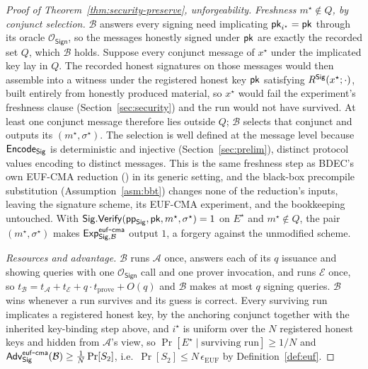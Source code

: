 \begin{proof}[Proof of Theorem~\ref{thm:security-preserve}, unforgeability]
\emph{Freshness $m^\star\notin Q$, by conjunct selection.} $\mathcal B$ answers every signing need implicating $\mathsf{pk}_{i^\star}=\mathsf{pk}$ through its oracle $\mathcal O_{\mathsf{Sign}}$, so the messages honestly signed under $\mathsf{pk}$ are exactly the recorded set $Q$, which $\mathcal B$ holds. Suppose every conjunct message of $x^\star$ under the implicated key lay in $Q$. The recorded honest signatures on those messages would then assemble into a witness under the registered honest key $\mathsf{pk}$ satisfying $R^{\mathsf{Sig}}(x^\star;\cdot)$, built entirely from honestly produced material, so $x^\star$ would fail the experiment's freshness clause (Section~\ref{sec:security}) and the run would not have survived. At least one conjunct message therefore lies outside $Q$; $\mathcal B$ selects that conjunct and outputs its $(m^\star,\sigma^\star)$. The selection is well defined at the message level because $\mathsf{Encode}_{\mathsf{Sig}}$ is deterministic and injective (Section~\ref{sec:prelim}), distinct protocol values encoding to distinct messages. This is the same freshness step as BDEC's own EUF-CMA reduction (\cite[Appendix~A.1]{10.1007/978-981-96-0957-4_3}) in its generic setting, and the black-box precompile substitution (Assumption~\ref{asm:bbt}) changes none of the reduction's inputs, leaving the signature scheme, its EUF-CMA experiment, and the bookkeeping untouched. With $\mathsf{Sig}.\mathsf{Verify}(\mathsf{pp}_{\mathsf{Sig}},\mathsf{pk},m^\star,\sigma^\star)=1$ on $E^\star$ and $m^\star\notin Q$, the pair $(m^\star,\sigma^\star)$ makes $\mathsf{Exp}^{\mathsf{euf\mbox{-}cma}}_{\mathsf{Sig},\mathcal B}$ output $1$, a forgery against the unmodified scheme.

\emph{Resources and advantage.} $\mathcal B$ runs $\mathcal A$ once, answers each of its $q$ issuance and showing queries with one $\mathcal O_{\mathsf{Sign}}$ call and one prover invocation, and runs $\mathcal E$ once, so $t_{\mathcal B}=t_{\mathcal A}+t_{\mathcal E}+q\cdot t_{\mathrm{prove}}+O(q)$ and $\mathcal B$ makes at most $q$ signing queries. $\mathcal B$ wins whenever a run survives and its guess is correct. Every surviving run implicates a registered honest key, by the anchoring conjunct together with the inherited key-binding step above, and $i^\star$ is uniform over the $N$ registered honest keys and hidden from $\mathcal A$'s view, so $\Pr[E^\star\mid\text{surviving run}]\ge 1/N$ and $\mathsf{Adv}^{\mathsf{euf\mbox{-}cma}}_{\mathsf{Sig}}(\mathcal B)\ge \tfrac1N\Pr[S_2]$, i.e.\ $\Pr[S_2]\le N\,\epsilon_{\mathrm{EUF}}$ by Definition~\ref{def:euf}.


\end{proof}
